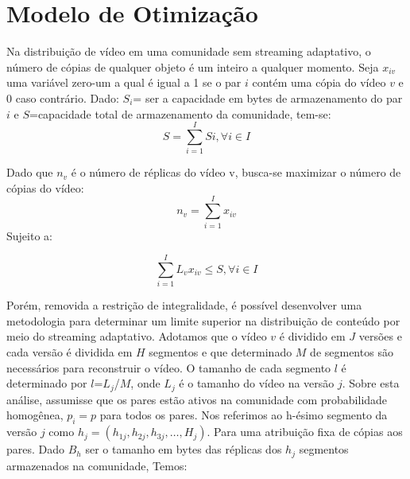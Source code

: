 \documentclass[
	12pt,				%
	oneside,			%
	a4paper,			%
	english,			%
	brazil				%
	]{abntex2ppgsi}
\begin{document}
\section{Modelo de Otimização}

Na distribuição de vídeo em uma comunidade sem streaming adaptativo, o número de cópias de qualquer objeto é um inteiro a qualquer momento. Seja $x_{iv}$ uma variável zero-um a qual é igual a 1 se o par $i$ contém uma cópia do vídeo $v$ e 0 caso contrário.
Dado: $S_i$= ser a capacidade em bytes de armazenamento do par $i$ e  $S$=capacidade total de armazenamento da comunidade, tem-se:
\begin{equation}
S=\sum_{i=1}^{I}Si,\forall i\in I
\end{equation}





Dado que $n_v$ é o número de réplicas do vídeo v, busca-se maximizar o número de cópias do vídeo:
\begin{equation}
n_{v}=\sum_{i=1}^{I}x_{iv}
	\label{eq:equacao-exemplo1}
\end{equation}
Sujeito a:

\begin{equation}
  \sum_{i=1}^{I}L_{v}x_{iv}\leq S, \forall i\in I
	\label{eq:equacao-exemplo3}
\end{equation}

\newcommand{\veth}{$h_{j}=(h_{1j},h_{2j},h_{3j},\ldots,H_j)$}
Porém, removida a restrição de integralidade, é possível desenvolver uma metodologia para determinar um limite superior na distribuição de conteúdo por meio do streaming adaptativo.
Adotamos que o vídeo $v$ é dividido em $J$ versões e cada versão é dividida em $H$ segmentos e que determinado $M$ de segmentos são necessários para reconstruir o vídeo. O tamanho de cada segmento $l$ é determinado por $l$=$L_j$/$M$, onde $L_j$ é o tamanho do vídeo na versão $j$.
Sobre esta análise, assumisse que os pares estão ativos na comunidade com probabilidade homogênea, $p_i=p$ para todos os pares.
Nos referimos ao h-ésimo segmento da versão $j$ como \veth. Para uma atribuição fixa de cópias aos pares. Dado $B_h$ ser o tamanho em bytes das réplicas dos $h_j$ segmentos armazenados na comunidade, Temos:
\end{document}
